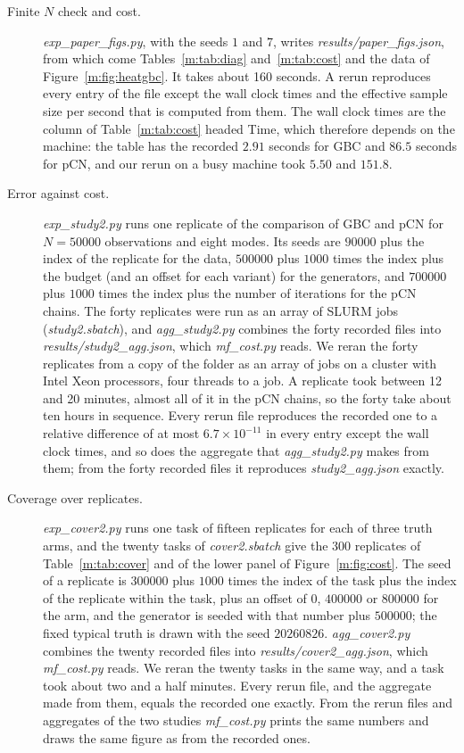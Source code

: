 \begin{description}
\item[Finite $N$ check and cost.] \textit{exp\_paper\_figs.py}, with the seeds $1$ and $7$, writes \textit{results/paper\_figs.json}, from which come Tables~\ref{m:tab:diag} and~\ref{m:tab:cost} and the data of Figure~\ref{m:fig:heatgbc}. It takes about 160 seconds. A rerun reproduces every entry of the file except the wall clock times and the effective sample size per second that is computed from them. The wall clock times are the column of Table~\ref{m:tab:cost} headed Time, which therefore depends on the machine: the table has the recorded $2.91$ seconds for GBC and $86.5$ seconds for pCN, and our rerun on a busy machine took $5.50$ and $151.8$.
\item[Error against cost.] \textit{exp\_study2.py} runs one replicate of the comparison of GBC and pCN for $N=50000$ observations and eight modes. Its seeds are $90000$ plus the index of the replicate for the data, $500000$ plus $1000$ times the index plus the budget (and an offset for each variant) for the generators, and $700000$ plus $1000$ times the index plus the number of iterations for the pCN chains. The forty replicates were run as an array of SLURM jobs (\textit{study2.sbatch}), and \textit{agg\_study2.py} combines the forty recorded files into \textit{results/study2\_agg.json}, which \textit{mf\_cost.py} reads. We reran the forty replicates from a copy of the folder as an array of jobs on a cluster with Intel Xeon processors, four threads to a job. A replicate took between 12 and 20 minutes, almost all of it in the pCN chains, so the forty take about ten hours in sequence. Every rerun file reproduces the recorded one to a relative difference of at most $6.7\times10^{-11}$ in every entry except the wall clock times, and so does the aggregate that \textit{agg\_study2.py} makes from them; from the forty recorded files it reproduces \textit{study2\_agg.json} exactly.
\item[Coverage over replicates.] \textit{exp\_cover2.py} runs one task of fifteen replicates for each of three truth arms, and the twenty tasks of \textit{cover2.sbatch} give the $300$ replicates of Table~\ref{m:tab:cover} and of the lower panel of Figure~\ref{m:fig:cost}. The seed of a replicate is $300000$ plus $1000$ times the index of the task plus the index of the replicate within the task, plus an offset of $0$, $400000$ or $800000$ for the arm, and the generator is seeded with that number plus $500000$; the fixed typical truth is drawn with the seed $20260826$. \textit{agg\_cover2.py} combines the twenty recorded files into \textit{results/cover2\_agg.json}, which \textit{mf\_cost.py} reads. We reran the twenty tasks in the same way, and a task took about two and a half minutes. Every rerun file, and the aggregate made from them, equals the recorded one exactly. From the rerun files and aggregates of the two studies \textit{mf\_cost.py} prints the same numbers and draws the same figure as from the recorded ones.

\end{description}
